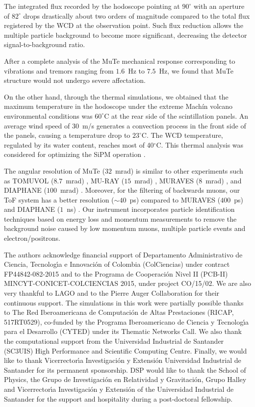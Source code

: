 \documentclass[letterpaper,11pt]{article}
\begin{document}
The integrated flux recorded by the hodoscope pointing at $90^{\circ}$ with an aperture of $82^{\circ}$ drops drastically about two orders of magnitude compared to the total flux registered by the WCD at the observation point. Such flux reduction allows the multiple particle background to become more significant, decreasing the detector signal-to-background ratio.

After a complete analysis of the MuTe mechanical response corresponding to vibrations and tremors ranging from $1.6$~Hz to $7.5$~Hz, we found that MuTe structure would not undergo severe affectation. 

On the other hand, through the thermal simulations, we obtained that the maximum temperature in the hodoscope under the extreme Mach\'in volcano environmental conditions was $60^{\circ}$C at the rear side of the scintillation panels. An average wind speed of $30$~m/s generates a convection process in the front side of the panels, causing a temperature drop to $23^{\circ}$C. The WCD temperature, regulated by its water content,  reaches most of 40$^{\circ}$C. This thermal analysis was considered for optimizing the SiPM operation \cite{PenaRodriguez2020}. 


The angular resolution of MuTe ($32$~mrad) is similar to other experiments such as TOMUVOL ($8.7$~mrad) \cite{Crloganu2013}, MU-RAY ($15$~mrad) \cite{Ambrosino2014}, MURAVES ($8$~mrad) \cite{Cimmino2017}, and DIAPHANE ($100$~mrad) \cite{Lesparre2012}. Moreover, for the filtering of backwards muons, our ToF system has a better resolution ($\sim 40$~ps) compared to MURAVES ($400$~ps) and DIAPHANE ($1$~ns) \cite{ jourde2013experimental}. Our instrument incorporates particle identification techniques based on energy loss and momentum measurements to remove the background noise caused by low momentum muons, multiple particle events and electron/positrons.



\acknowledgments
The authors acknowledge  financial support of  Departamento Administrativo de Ciencia, Tecnolog\'{\i}a e Innovaci\'on of Colombia (ColCiencias) under contract FP44842-082-2015 and to the Programa de Cooperaci\'on Nivel II (PCB-II) MINCYT-CONICET-COLCIENCIAS 2015, under project CO/15/02.  We are also very thankful to LAGO and to the Pierre Auger Collaboration for their continuous support.  The simulations in this work were partially possible thanks to The Red Iberoamericana de Computaci\'on de Altas Prestaciones (RICAP, 517RT0529), co-funded by the Programa Iberoamericano de Ciencia y Tecnolog\'{\i}a para el Desarrollo (CYTED) under its Thematic Networks Call. We also thank the computational support from the Universidad Industrial de Santander (SC3UIS) High Performance and Scientific Computing Centre. Finally, we would like to thank Vicerrector\'{\i}a Investigaci\'on y Extensi\'on Universidad Industrial de Santander for its permanent sponsorship. DSP would like to thank the School of Physics, the Grupo de Investigación en Relatividad y Gravitación, Grupo Halley and Vicerrector\'{\i}a Investigaci\'on y Extensi\'on of the Universidad Industrial de Santander for the support and hospitality during a post-doctoral fellowship.
\end{document}
